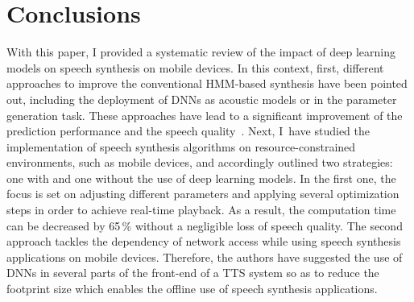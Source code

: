 

\section{Conclusions}
\label{sec:conclusion}

With this paper, I provided a systematic review of the impact of deep learning models on speech synthesis on mobile devices. In this context, first, different approaches to improve the conventional \ac{HMM}-based synthesis have been pointed out, including the deployment of \acp{DNN} as acoustic models or in the parameter generation task. These approaches have lead to a significant improvement of the prediction performance and the speech quality~\cite{zen:deepstatistical, hashimoto:effect}. 
Next, I~have studied the implementation of speech synthesis algorithms on resource-constrained environments,
such as mobile devices, 
and accordingly outlined
two strategies: one with and one without the use of deep learning models. In the first one, the focus is set on adjusting different parameters and applying several optimization steps \cite{toth:optimizing} in order to achieve real-time playback. As a result, the computation time can be decreased by 65\,\% without a negligible loss of speech quality. The second approach \cite{boros:robust} tackles the dependency of network access while using speech synthesis applications on mobile devices. Therefore, the authors have suggested the use of \acp{DNN} in several parts of the front-end of a \ac{TTS} system so as to reduce the footprint size which enables the offline use of speech synthesis applications.

